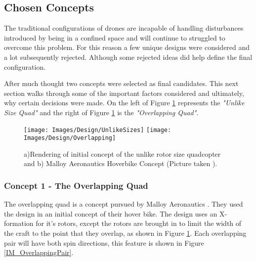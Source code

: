 		\subsection{Chosen Concepts}
		The traditional configurations of drones are incapable of handling disturbances introduced by being in a confined space and will continue to struggled to overcome this problem. For this reason a few unique designs were considered and a lot subsequently rejected. Although some rejected ideas did help define the final configuration.
		
		After much thought two concepts were selected as final candidates. This next section walks through some of the important factors considered and ultimately, why certain decisions were made. 
		On the left of Figure \ref{IM_UnlikeSizes} represents the \textit{"Unlike Size Quad"} and the right of Figure \ref{IM_UnlikeSizes} is the \textit{"Overlapping Quad"}. 
		\begin{figure}[H]
		\centering
		\texttt{[image: Images/Design/UnlikeSizes]}
		\texttt{[image: Images/Design/Overlapping]}
		\caption{a)Rendering of initial concept of the unlike rotor size quadcopter and b) Malloy Aeronautics Hoverbike Concept (Picture taken \cite{MAHover}).}
		\label{IM_UnlikeSizes}
		\end{figure}
			\subsubsection{Concept 1 - The Overlapping Quad}
			The overlapping quad is a concept pursued by Malloy Aeronautics \cite{MAHover}. They used the design in an initial concept of their hover bike. The design uses an X-formation for it's rotors, except the rotors are brought in to limit the width of the craft to the point that they overlap, as shown in Figure \ref{IM_UnlikeSizes}. Each overlapping pair will have both spin directions, this feature is shown in Figure \ref{IM_OverlappingPair}.
		
